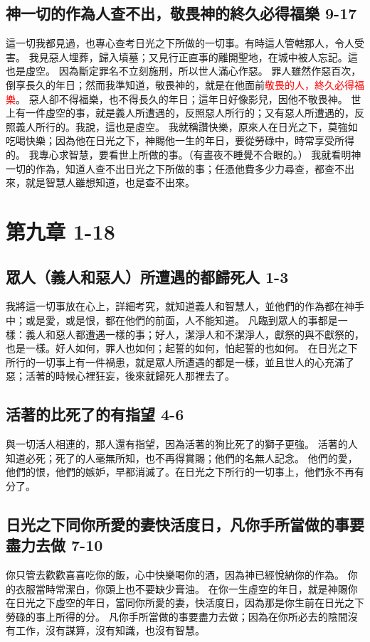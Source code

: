\subsection{神一切的作為人查不出，敬畏神的終久必得福樂 9-17}
這一切我都見過，也專心查考日光之下所做的一切事。有時這人管轄那人，令人受害。
我見惡人埋葬，歸入墳墓；又見行正直事的離開聖地，在城中被人忘記。這也是虛空。
因為斷定罪名不立刻施刑，所以世人滿心作惡。
罪人雖然作惡百次，倒享長久的年日；然而我準知道，敬畏神的，就是在他面前\textcolor{red}{敬畏的人，終久必得福樂}。
惡人卻不得福樂，也不得長久的年日；這年日好像影兒，因他不敬畏神。
世上有一件虛空的事，就是義人所遭遇的，反照惡人所行的；又有惡人所遭遇的，反照義人所行的。我說，這也是虛空。
我就稱讚快樂，原來人在日光之下，莫強如吃喝快樂；因為他在日光之下，神賜他一生的年日，要從勞碌中，時常享受所得的。
我專心求智慧，要看世上所做的事。（有晝夜不睡覺不合眼的。）
我就看明神一切的作為，知道人查不出日光之下所做的事；任憑他費多少力尋查，都查不出來，就是智慧人雖想知道，也是查不出來。




\section{第九章  1-18}
\subsection{眾人（義人和惡人）所遭遇的都歸死人 1-3}
我將這一切事放在心上，詳細考究，就知道義人和智慧人，並他們的作為都在神手中；或是愛，或是恨，都在他們的前面，人不能知道。
凡臨到眾人的事都是一樣：義人和惡人都遭遇一樣的事；好人，潔淨人和不潔淨人，獻祭的與不獻祭的，也是一樣。好人如何，罪人也如何；起誓的如何，怕起誓的也如何。
在日光之下所行的一切事上有一件禍患，就是眾人所遭遇的都是一樣，並且世人的心充滿了惡；活著的時候心裡狂妄，後來就歸死人那裡去了。

\subsection{活著的比死了的有指望 4-6}
與一切活人相連的，那人還有指望，因為活著的狗比死了的獅子更強。
活著的人知道必死；死了的人毫無所知，也不再得賞賜；他們的名無人記念。
他們的愛，他們的恨，他們的嫉妒，早都消滅了。在日光之下所行的一切事上，他們永不再有分了。

\subsection{日光之下同你所愛的妻快活度日，凡你手所當做的事要盡力去做 7-10}
你只管去歡歡喜喜吃你的飯，心中快樂喝你的酒，因為神已經悅納你的作為。
你的衣服當時常潔白，你頭上也不要缺少膏油。
在你一生虛空的年日，就是神賜你在日光之下虛空的年日，當同你所愛的妻，快活度日，因為那是你生前在日光之下勞碌的事上所得的分。
凡你手所當做的事要盡力去做；因為在你所必去的陰間沒有工作，沒有謀算，沒有知識，也沒有智慧。

